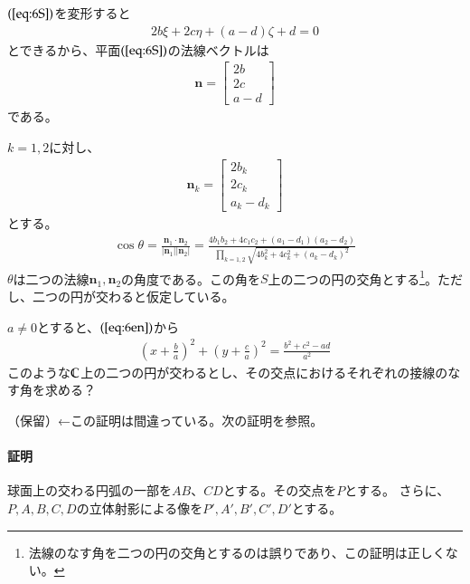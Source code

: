 $(\ref{eq:6S})$を変形すると
\begin{align*}
    2b\xi+2c\eta+(a-d)\zeta+d=0
\end{align*}
とできるから、平面$(\ref{eq:6S})$の法線ベクトルは
\begin{align*}
    \bm{n}=\begin{bmatrix}
        2b \\ 2c \\ a-d
    \end{bmatrix}
\end{align*}
である。

$k=1,2$に対し、
\begin{align*}
    \bm{n}_k=\begin{bmatrix}
        2b_k \\ 2c_k \\ a_k-d_k
    \end{bmatrix}
\end{align*}
とする。
\begin{align*}
    \cos\theta
    =\frac{\bm{n}_1\cdot\bm{n}_2}{|\bm{n}_1||\bm{n}_2|}
    =\frac{4b_1b_2+4c_1c_2+(a_1-d_1)(a_2-d_2)}{\prod_{k=1,2}\sqrt{4b_k^2+4c_k^2+(a_k-d_k)^2}}
\end{align*}
$\theta$は二つの法線$\bm{n}_1,\bm{n}_2$の角度である。この角を$S$上の二つの円の交角とする\footnote{法線のなす角を二つの円の交角とするのは誤りであり、この証明は正しくない。}。ただし、二つの円が交わると仮定している。

$a\neq0$とすると、$(\ref{eq:6en})$から
\begin{align*}
    \left(x+\frac{b}{a}\right)^2
    +\left(y+\frac{c}{a}\right)^2
    =\frac{b^2+c^2-ad}{a^2}
\end{align*}
このような$\mathbb{C}$上の二つの円が交わるとし、その交点におけるそれぞれの接線のなす角を求める？

（保留）←この証明は間違っている。次の証明を参照。
\newpage
\paragraph{証明}
球面上の交わる円弧の一部を$AB$、$CD$とする。その交点を$P$とする。
さらに、$P,A,B,C,D$の立体射影による像を$P',A',B',C',D'$とする。

